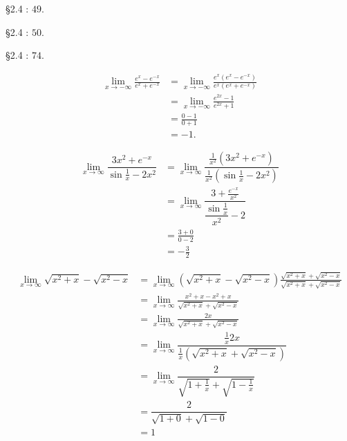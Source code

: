\documentclass{hwset}
\begin{document}
\begin{problem}[1.]
	\be
		\item \S 2.4 : $49$.
		\item \S 2.4 : $50$.
		\item \S 2.4 : $74$.
	\ee
\end{problem}

\be
	\item 
	\begin{solution}
		\begin{align*}
			\lim_{x\to -\infty} \frac{e^x - e^{-x}}{e^x + e^{-x}} &= \lim_{x\to
				-\infty} \frac{e^{x}\left(e^x - e^{-x}\right)}{e^x\left(e^x +
				e^{-x}\right)} \\
			&= \lim_{x\to -\infty} \frac{e^{2x} - 1}{e^{2x} + 1} \\
			&= \frac{0 - 1}{0 + 1} \\
			&= \boxed{-1}.
		\end{align*}
	\end{solution}
	\item 
	\begin{solution}
		\begin{align*}
			\lim_{x\to \infty} \dfrac{3x^2 + e^{-x}}{\sin \frac{1}{x} - 2x^2} &=
				\lim_{x\to \infty} \dfrac{\frac{1}{x^2}\left(3x^2 +
				e^{-x}\right)}{\frac{1}{x^2}\left(\sin \frac{1}{x} - 2x^2\right)} \\
			&=\lim_{x\to \infty} \dfrac{3 + \frac{e^{-x}}{x^2}}{\dfrac{\sin
				\frac{1}{x}}{x^2} - 2} \\
			&=\frac{3 + 0}{0 - 2} \\
			&=\boxed{-\frac{3}{2}}
		\end{align*}
	\end{solution}
	\item 
	\begin{solution}
		\begin{align*}
			\lim_{x\to \infty} \sqrt{x^2 + x} - \sqrt{x^2 - x} &= \lim_{x\to \infty}
				\left(\sqrt{x^2 + x} - \sqrt{x^2 - x}\right) \frac{\sqrt{x^2 + x} +
				\sqrt{x^2 - x}}{\sqrt{x^2 + x} + \sqrt{x^2 - x}} \\
			&= \lim_{x\to \infty} \frac{x^2 + x - x^2 + x}{\sqrt{x^2 + x} + \sqrt{x^2 - x}} \\
			&= \lim_{x\to \infty} \frac{2x}{\sqrt{x^2 + x} + \sqrt{x^2 - x}} \\
			&= \lim_{x\to \infty} \dfrac{\frac{1}{x} 2x}{\frac{1}{x}\left(\sqrt{x^2 + x}
				+ \sqrt{x^2 - x}\right)} \\
			&= \lim_{x\to \infty} \dfrac{2}{\sqrt{1 + \frac{1}{x}} + \sqrt{1 -
				\frac{1}{x}}} \\
			&= \dfrac{2}{\sqrt{1 + 0} + \sqrt{1 - 0}} \\
			&= \boxed{1}
		\end{align*}
	\end{solution}
\ee
\end{document}
